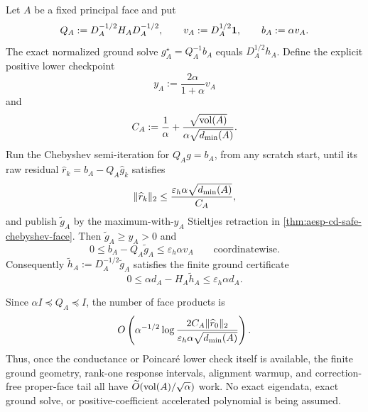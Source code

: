 \begin{corollary}
\label{cor:aesp-cd-proper-face-accelerated-ground-certificate}
Let \(A\) be a fixed principal face and put
\begin{equation*}
 Q_A:=D_A^{-1/2}H_AD_A^{-1/2},
 \qquad
 v_A:=D_A^{1/2}\mathbf{1},
 \qquad
 b_A:=\alpha v_A.
\end{equation*}
The exact normalized ground solve \(g_A^\star=Q_A^{-1}b_A\) equals
\(D_A^{1/2}h_A\).  Define the explicit positive lower checkpoint
\begin{equation*}
 y_A:=\frac{2\alpha}{1+\alpha}v_A
\end{equation*}
and
\begin{equation*}
 C_A:=
 \frac1\alpha+
 \frac{\sqrt{\operatorname{vol}(A)}}{\alpha\sqrt{d_{\min}(A)}}.
\end{equation*}
Run the Chebyshev semi-iteration for \(Q_Ag=b_A\), from any scratch start,
until its raw residual \(\widehat r_k=b_A-Q_A\widehat g_k\) satisfies
\begin{equation}
 \lVert\widehat r_k\rVert_2
 \leq
 \frac{\varepsilon_h\alpha\sqrt{d_{\min}(A)}}{C_A},
 \label{eq:aesp-cd-proper-face-accelerated-ground-raw-target}
\end{equation}
and publish \(\widetilde g_A\) by the maximum-with-\(y_A\) Stieltjes
retraction in \cref{thm:aesp-cd-safe-chebyshev-face}.  Then
\(\widetilde g_A\geq y_A>0\) and
\begin{equation}
 0\leq b_A-Q_A\widetilde g_A
 \leq\varepsilon_h\alpha v_A
 \qquad\text{coordinatewise}.
 \label{eq:aesp-cd-proper-face-accelerated-ground-normalized-residual}
\end{equation}
Consequently
\(\widetilde h_A:=D_A^{-1/2}\widetilde g_A\) satisfies the finite ground
certificate
\begin{equation*}
 0\leq\alpha d_A-H_A\widetilde h_A
 \leq\varepsilon_h\alpha d_A.
\end{equation*}

Since \(\alpha I\preceq Q_A\preceq I\), the number of face products is
\begin{equation}
 O\left(
 \alpha^{-1/2}
 \log\frac{2C_A\lVert\widehat r_0\rVert_2}
               {\varepsilon_h\alpha\sqrt{d_{\min}(A)}}
 \right).
 \label{eq:aesp-cd-proper-face-accelerated-ground-work}
\end{equation}
Thus, once the conductance or Poincar\'e lower check itself is available,
the finite ground geometry, rank-one response intervals, alignment warmup,
and correction-free proper-face tail all have
\(\widetilde O(\operatorname{vol}(A)/\sqrt\alpha)\) work.  No exact eigendata, exact ground
solve, or positive-coefficient accelerated polynomial is being assumed.
\end{corollary}

